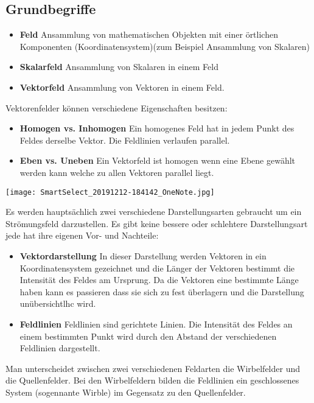 \documentclass{article}
\begin{document}
    \subsection{Grundbegriffe}
    \begin{itemize}
        \item \textbf{Feld}
        \subitem Ansammlung von mathematischen Objekten mit einer örtlichen Komponenten (Koordinatensystem)(zum Beispiel Ansammlung von Skalaren)
        \item \textbf{Skalarfeld}
        \subitem Ansammlung von Skalaren in einem Feld
        \item\textbf{Vektorfeld}
        \subitem Ansammlung von Vektoren in einem Feld.
    \end{itemize}
    Vektorenfelder können verschiedene Eigenschaften besitzen: 
    \begin{itemize}
        \item \textbf{Homogen vs. Inhomogen}
        \subitem Ein homogenes Feld hat in jedem Punkt des Feldes derselbe Vektor. Die Feldlinien verlaufen parallel.
        \item \textbf{Eben vs. Uneben}
        \subitem Ein Vektorfeld ist homogen wenn eine Ebene gewählt werden kann welche zu allen Vektoren parallel liegt.
    \end{itemize}
    \begin{center}
        \texttt{[image: SmartSelect\_20191212-184142\_OneNote.jpg]}
    \end{center}
    Es werden hauptsächlich zwei verschiedene Darstellungsarten gebraucht um ein Strömungsfeld darzustellen. Es gibt keine bessere oder schlehtere Darstellungsart jede hat ihre eigenen Vor- und Nachteile:
    \begin{itemize}
        \item \textbf{Vektordarstellung}
        \subitem In dieser Darstellung werden Vektoren in ein Koordinatensystem gezeichnet und die Länger der Vektoren bestimmt die Intensität des Feldes am Ursprung. Da die Vektoren eine bestimmte Länge haben kann es passieren dass sie sich zu fest überlagern und die Darstellung unübersichtlhc wird.
        \item \textbf{Feldlinien}
        \subitem Feldlinien sind gerichtete Linien. Die Intensität des Feldes an einem bestimmten Punkt wird durch den Abstand der verschiedenen Feldlinien dargestellt.
    \end{itemize}
    Man unterscheidet zwischen zwei verschiedenen Feldarten die Wirbelfelder und die Quellenfelder. Bei den Wirbelfeldern bilden die Feldlinien ein geschlossenes System (sogennante Wirble) im Gegensatz zu den Quellenfelder.
\end{document}
